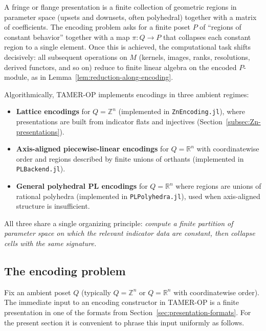\documentclass{article}
\newcommand{\<}{\langle}
\renewcommand{\>}{\rangle}
\theoremstyle{definition}
\theoremstyle{remark}
\begin{document}
	A fringe or flange presentation is a finite collection of geometric regions in parameter space (upsets and downsets, often polyhedral) together with a matrix of coefficients.  The encoding problem asks for a finite poset $P$ of ``regions of constant behavior'' together with a map $\pi\colon Q\to P$ that collapses each constant region to a single element. Once this is achieved, the computational task shifts decisively: all subsequent operations on $M$ (kernels, images, ranks, resolutions, derived functors, and so on) reduce to finite linear algebra on the encoded $P$-module, as in Lemma~\ref{lem:reduction-along-encoding}.
	
	Algorithmically, TAMER-OP implements encodings in three ambient regimes:
	\begin{itemize}
		\item \textbf{Lattice encodings} for $Q=\mathbb{Z}^n$ (implemented in
		\texttt{ZnEncoding.jl}), where presentations are built from indicator flats and
		injectives (Section~\ref{subsec:Zn-presentations}).
		\item \textbf{Axis-aligned piecewise-linear encodings} for $Q=\mathbb{R}^n$
		with coordinatewise order and regions described by finite unions of orthants
		(implemented in \texttt{PLBackend.jl}).
		\item \textbf{General polyhedral PL encodings} for $Q=\mathbb{R}^n$ where
		regions are unions of rational polyhedra (implemented in \texttt{PLPolyhedra.jl}),
		used when axis-aligned structure is insufficient.
	\end{itemize}
	All three share a single organizing principle: \emph{compute a finite partition of
		parameter space on which the relevant indicator data are constant, then collapse
		cells with the same signature.}
	
	\subsection{The encoding problem}
	\label{subsec:encoding-problem}
	
	Fix an ambient poset $Q$ (typically $Q=\mathbb{Z}^n$ or $Q=\mathbb{R}^n$ with
	coordinatewise order).  The immediate input to an encoding constructor in
	TAMER-OP is a finite presentation in one of the formats from
	Section~\ref{sec:presentation-formats}.  For the present section it is convenient
	to phrase this input uniformly as follows.
	
\end{document}
